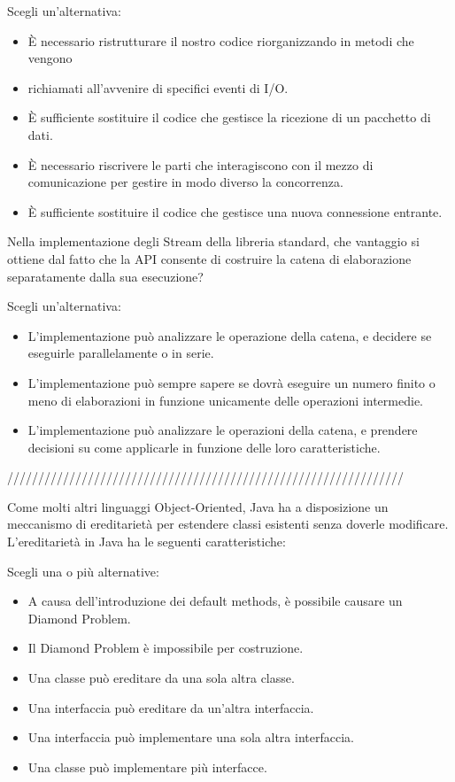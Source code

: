 \documentclass{article}
\begin{document}
Scegli un'alternativa: 

\begin{itemize}
	\item È necessario ristrutturare il nostro codice riorganizzando in metodi che vengono
	\item richiamati all'avvenire di specifici eventi di I/O. \checkmark
	\item È sufficiente sostituire il codice che gestisce la ricezione di un pacchetto di dati.
	\item È necessario riscrivere le parti che interagiscono con il mezzo di comunicazione per gestire in modo diverso la concorrenza.
	\item È sufficiente sostituire il codice che gestisce una nuova connessione entrante.
\end{itemize}

Nella implementazione degli Stream della libreria standard, che vantaggio si ottiene dal fatto che la API consente di costruire la catena di elaborazione separatamente
dalla sua esecuzione?

Scegli un'alternativa:

\begin{itemize}
	\item L'implementazione può analizzare le operazione della catena, e decidere se eseguirle parallelamente o in serie.
	\item L'implementazione può sempre sapere se dovrà eseguire un numero finito o meno di elaborazioni in funzione unicamente delle operazioni intermedie.
	\item L'implementazione può analizzare le operazioni della catena, e 
		prendere decisioni su come applicarle in funzione delle loro 
		caratteristiche. \checkmark
\end{itemize}

////////////////////////////////////////////////////////////////

Come molti altri linguaggi Object-Oriented, Java ha a disposizione un meccanismo di ereditarietà per estendere classi esistenti senza doverle modificare. L'ereditarietà
in Java ha le seguenti caratteristiche:

Scegli una o più alternative:

\begin{itemize}
	\item A causa dell'introduzione dei default methods, è possibile causare un 
		Diamond Problem. \checkmark
	\item Il Diamond Problem è impossibile per costruzione.
	\item Una classe può ereditare da una sola altra classe. \checkmark
	\item Una interfaccia può ereditare da un'altra interfaccia. \checkmark
	\item Una interfaccia può implementare una sola altra interfaccia.
	\item Una classe può implementare più interfacce. \checkmark
\end{itemize}
\end{document}
